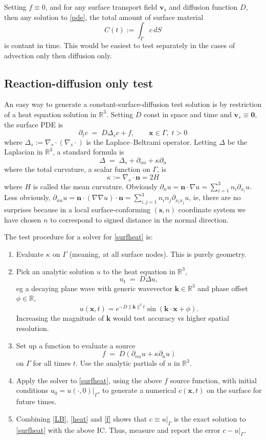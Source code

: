 \documentclass[11pt]{article}
\newcommand{\ben}{\begin{enumerate}}
\newcommand{\een}{\end{enumerate}}
\newcommand{\be}{\begin{equation}}
\newcommand{\ee}{\end{equation}}
\newcommand{\mbf}[1]{{\mathbf #1}}
\newcommand{\R}{\mathbb{R}}
\newcommand{\x}{\mbf{x}}
\newcommand{\n}{\mbf{n}}
\newcommand{\kk}{\mbf{k}}
\newcommand{\vv}{\mbf{v}}
\begin{document}
Setting $f\equiv0$, and for any surface transport
field $\vv_s$ and diffusion function $D$, then any solution to \eqref{pde},
the total amount of surface material
$$
C(t) := \int_\Gamma c \,dS
$$
is contant in time.
This would be easiest to test separately in the cases of advection
only then diffusion only.


\subsection{Reaction-diffusion only test}

An easy way to generate a constant-surface-diffusion test solution is
by restriction of a heat equation solution in $\R^3$.
Setting $D$ const in space and time and $\vv_s\equiv\mbf{0}$,
the surface PDE is
\be
\partial_t c \;=\;
D \Delta_s c + f
, \qquad \x\in\Gamma, \;t>0
\label{surfheat}
\ee
where $\Delta_s := \nabla_s\cdot (\nabla_s \cdot)$ is the Laplace--Beltrami
operator.
Letting $\Delta$ be the Laplacian in $\R^3$, a standard formula is
\be
\Delta \;=\; \Delta_s + \partial_{nn} + \kappa \partial_n
\label{LB}
\ee
where the total curvature, a scalar function on $\Gamma$, is
\be
\kappa := \nabla_s\cdot \n = 2H
\label{kappa}
\ee
where $H$ is called the mean curvature.
Obviously
$\partial_{n} u= \n \cdot \nabla u = \sum_{i=1}^3 n_i \partial_{x_i} u$.
Less obviously,
$\partial_{nn} u= \n\cdot (\nabla\nabla u) \cdot \n = \sum_{i,j=1}^3 n_i n_j \partial_{x_ix_j} u$, ie, there are no surprises because in a local surface-conforming $(\mbf{s},n)$
coordinate system we have chosen $n$ to correspond to signed distance in the
normal direction.

The test procedure for a solver for \eqref{surfheat} is:
\ben
\item
  Evaluate $\kappa$ on $\Gamma$ (meaning, at all surface nodes). This
  is purely geometry.
\item Pick an analytic
  solution $u$ to the heat equation in $\R^3$,
  \be
  u_t \;=\;D \Delta u,
  \label{heat}
  \ee
  eg a decaying
  plane wave with generic wavevector $\kk\in\R^3$ and phase offset $\phi\in\R$,
  $$
  u(\x,t) = e^{-D\|\kk\|^2 t} \sin(\kk\cdot \x + \phi).
  $$
  Increasing the magnitude of $\kk$ would test accuracy vs higher spatial
  resolution.
\item
  Set up a function to evaluate a source
  \be
  f \;=\; D(\partial_{nn} u + \kappa \partial_n u)
  \label{f}
  \ee
  on $\Gamma$ for all times $t$. Use the analytic partials of $u$ in $\R^3$.
\item
  Apply the solver to \eqref{surfheat}, using the above $f$ source function,
  with initial conditions $u_0 = u(\cdot,0)|_\Gamma$,
  to generate a numerical $c(\x,t)$ on the surface for future times.
\item
  Combining \eqref{LB}, \eqref{heat} and \eqref{f} shows that
  $c \equiv u|_\Gamma$ is the exact solution to \eqref{surfheat} with the above
  IC.
  Thus, measure and report the error $c - u|_\Gamma$.
\een
\end{document}
